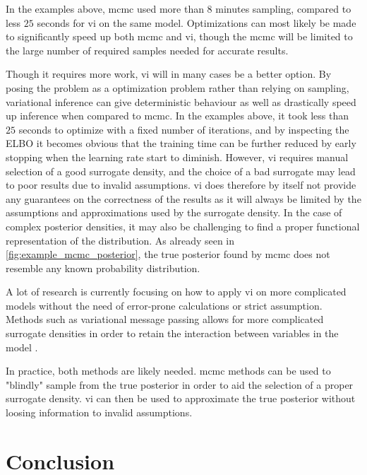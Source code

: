 In the examples above, \acrshort{mcmc} used more than $8$ minutes sampling, compared to less $25$ seconds for \acrshort{vi} on the same model. Optimizations can most likely be made to significantly speed up both \acrshort{mcmc} and \acrshort{vi}, though the \acrshort{mcmc} will be limited to the large number of required samples needed for accurate results. 



Though it requires more work, \acrshort{vi} will in many cases be a better option. By posing the problem as a optimization problem rather than relying on sampling, variational inference can give deterministic behaviour as well as drastically speed up inference when compared to \acrshort{mcmc}. In the examples above, it took less than $25$ seconds to optimize with a fixed number of iterations, and by inspecting the ELBO it becomes obvious that the training time can be further reduced by early stopping when the learning rate start to diminish. 
However, \acrshort{vi} requires manual selection of a good surrogate density, and the choice of a bad surrogate may lead to poor results due to invalid assumptions. \acrshort{vi} does therefore by itself not provide any guarantees on the correctness of the results as it will always be limited by the assumptions and approximations used by the surrogate density. In the case of complex posterior densities, it may also be challenging to find a proper functional representation of the distribution. As already seen in \cref{fig:example_mcmc_posterior}, the true posterior found by \acrshort{mcmc} does not resemble any known probability distribution. 

A lot of research is currently focusing on how to apply \acrshort{vi} on more complicated models without the need of error-prone calculations or strict assumption. Methods such as variational message passing allows for more complicated surrogate densities in order to retain the interaction between variables in the model \cite{winnbishop}. 

In practice, both methods are likely needed. \acrshort{mcmc} methods can be used to "blindly" sample from the true posterior in order to aid the selection of a proper surrogate density. \acrshort{vi} can then be used to approximate the true posterior without loosing information to invalid assumptions. 

\section{Conclusion}

